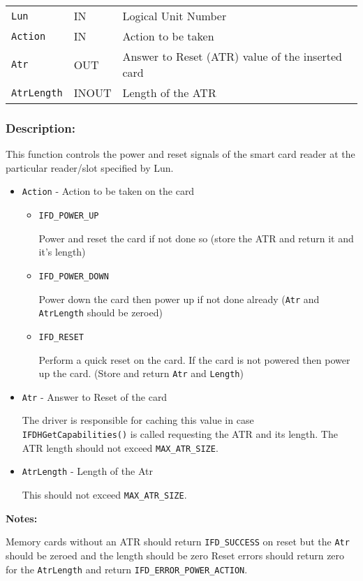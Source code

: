 \documentclass[a4paper,12pt]{article}
\newcommand{\desc}{\subsubsection{Description:}}
\begin{document}
\begin{tabular}{lll}
\texttt{Lun} & IN & Logical Unit Number\\
\texttt{Action} & IN & Action to be taken\\
\texttt{Atr} & OUT & Answer to Reset (ATR) value of the inserted card\\
\texttt{AtrLength} & INOUT & Length of the ATR\\
\end{tabular}

\desc

This function controls the power and reset signals of the smart card
reader at the particular reader/slot specified by Lun.

\begin{itemize}
\item \texttt{Action} - Action to be taken on the card

\begin{itemize}
\item \texttt{IFD\_POWER\_UP}

Power and reset the card if not done so (store the ATR and return it and
it's length)

\item \texttt{IFD\_POWER\_DOWN}

Power down the card then power up if not done already (\texttt{Atr} and
\texttt{AtrLength} should be zeroed)

\item \texttt{IFD\_RESET}

Perform a quick reset on the card. If the card is not powered then power
up the card. (Store and return \texttt{Atr} and \texttt{Length})

\end{itemize}

\item \texttt{Atr} - Answer to Reset of the card

The driver is responsible for caching this value in case
\texttt{IFDHGetCapabilities()} is called requesting the ATR and its
length. The ATR length should not exceed \texttt{MAX\_ATR\_SIZE}.

\item \texttt{AtrLength} - Length of the Atr

This should not exceed \texttt{MAX\_ATR\_SIZE}.

\end{itemize}

\textbf{Notes:}

Memory cards without an ATR should return \texttt{IFD\_SUCCESS} on reset
but the \texttt{Atr} should be zeroed and the length should be zero
Reset errors should return zero for the \texttt{AtrLength} and return
\texttt{IFD\_ERROR\_POWER\_ACTION}.
\end{document}
